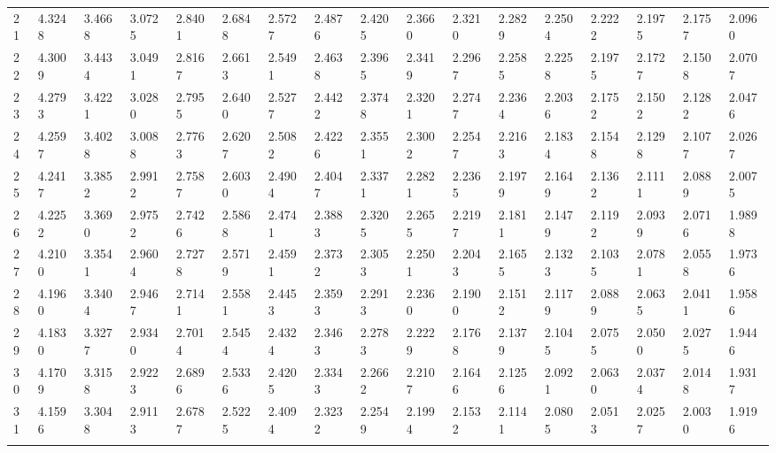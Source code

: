 {\begin{tabular}{|m{8pt}|m{18pt}*{15}{m{18pt}}}
 21 & 4.3248 & 3.4668 & 3.0725 & 2.8401 & 2.6848 & 2.5727 & 2.4876 & 2.4205 & 2.3660 & 2.3210 & 2.2829 & 2.2504 & 2.2222 & 2.1975 & 2.1757 & 2.0960 \\[2pt] \arrayrulecolor{light-gray}\hline\arrayrulecolor{black}  
 22 & 4.3009 & 3.4434 & 3.0491 & 2.8167 & 2.6613 & 2.5491 & 2.4638 & 2.3965 & 2.3419 & 2.2967 & 2.2585 & 2.2258 & 2.1975 & 2.1727 & 2.1508 & 2.0707 \\[2pt] \arrayrulecolor{light-gray}\hline\arrayrulecolor{black}  
 23 & 4.2793 & 3.4221 & 3.0280 & 2.7955 & 2.6400 & 2.5277 & 2.4422 & 2.3748 & 2.3201 & 2.2747 & 2.2364 & 2.2036 & 2.1752 & 2.1502 & 2.1282 & 2.0476 \\[2pt] \arrayrulecolor{light-gray}\hline\arrayrulecolor{black}  
 24 & 4.2597 & 3.4028 & 3.0088 & 2.7763 & 2.6207 & 2.5082 & 2.4226 & 2.3551 & 2.3002 & 2.2547 & 2.2163 & 2.1834 & 2.1548 & 2.1298 & 2.1077 & 2.0267 \\[2pt] \arrayrulecolor{light-gray}\hline\arrayrulecolor{black}  
 25 & 4.2417 & 3.3852 & 2.9912 & 2.7587 & 2.6030 & 2.4904 & 2.4047 & 2.3371 & 2.2821 & 2.2365 & 2.1979 & 2.1649 & 2.1362 & 2.1111 & 2.0889 & 2.0075 \\[2pt] \arrayrulecolor{light-gray}\hline\arrayrulecolor{black}  
 26 & 4.2252 & 3.3690 & 2.9752 & 2.7426 & 2.5868 & 2.4741 & 2.3883 & 2.3205 & 2.2655 & 2.2197 & 2.1811 & 2.1479 & 2.1192 & 2.0939 & 2.0716 & 1.9898 \\[2pt] \arrayrulecolor{light-gray}\hline\arrayrulecolor{black}  
 27 & 4.2100 & 3.3541 & 2.9604 & 2.7278 & 2.5719 & 2.4591 & 2.3732 & 2.3053 & 2.2501 & 2.2043 & 2.1655 & 2.1323 & 2.1035 & 2.0781 & 2.0558 & 1.9736 \\[2pt] \arrayrulecolor{light-gray}\hline\arrayrulecolor{black}  
 28 & 4.1960 & 3.3404 & 2.9467 & 2.7141 & 2.5581 & 2.4453 & 2.3593 & 2.2913 & 2.2360 & 2.1900 & 2.1512 & 2.1179 & 2.0889 & 2.0635 & 2.0411 & 1.9586 \\[2pt] \arrayrulecolor{light-gray}\hline\arrayrulecolor{black}  
 29 & 4.1830 & 3.3277 & 2.9340 & 2.7014 & 2.5454 & 2.4324 & 2.3463 & 2.2783 & 2.2229 & 2.1768 & 2.1379 & 2.1045 & 2.0755 & 2.0500 & 2.0275 & 1.9446 \\[2pt] \arrayrulecolor{light-gray}\hline\arrayrulecolor{black}  
 30 & 4.1709 & 3.3158 & 2.9223 & 2.6896 & 2.5336 & 2.4205 & 2.3343 & 2.2662 & 2.2107 & 2.1646 & 2.1256 & 2.0921 & 2.0630 & 2.0374 & 2.0148 & 1.9317 \\[2pt] \arrayrulecolor{light-gray}\hline\arrayrulecolor{black}  
 31 & 4.1596 & 3.3048 & 2.9113 & 2.6787 & 2.5225 & 2.4094 & 2.3232 & 2.2549 & 2.1994 & 2.1532 & 2.1141 & 2.0805 & 2.0513 & 2.0257 & 2.0030 & 1.9196 \\[2pt] \arrayrulecolor{light-gray}\hline\arrayrulecolor{black}  

\end{tabular}}
